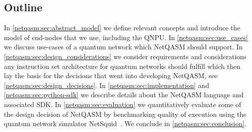 \subsection{Outline}
In \cref{netqasm:sec:abstract_model} we define relevant concepts and introduce the model of end-nodes that we use, including the \ac{QNPU}.
In \cref{netqasm:sec:use_cases} we discuss use-cases of a quantum network which \ac{NetQASM} should support.
In \cref{netqasm:sec:design_considerations} we consider requirements and considerations any instruction set architecture for quantum networks should fulfill which then lay the basis for the decisions that went into developing \ac{NetQASM}, see \cref{netqasm:sec:design_decisions}.
In \cref{netqasm:sec:implementation} and \cref{netqasm:sec:python-sdk} we describe details about the \ac{NetQASM} language and associated SDK.
In \cref{netqasm:sec:evaluation} we quantitatively evaluate some of the design decision of \ac{NetQASM} by benchmarking quality of execution using the quantum network simulator NetSquid~\cite{netsquid,coopmans2021netsquid}.
We conclude in \cref{netqasm:sec:conclusion}.